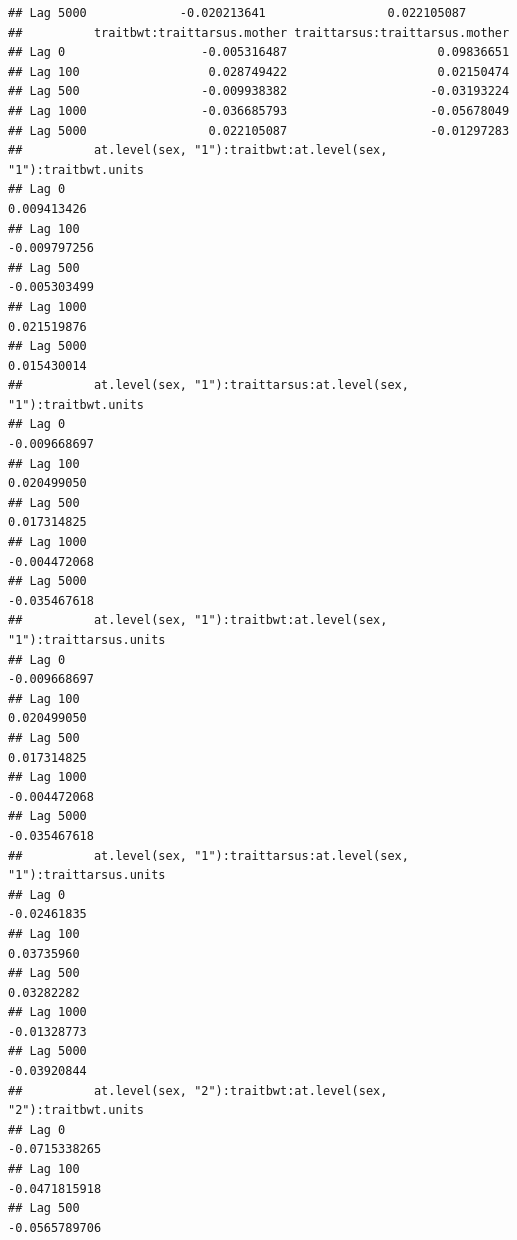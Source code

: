 \documentclass[
  12pt,
]{book}
\begin{document}
\begin{verbatim}
## Lag 5000             -0.020213641                 0.022105087
##          traitbwt:traittarsus.mother traittarsus:traittarsus.mother
## Lag 0                   -0.005316487                     0.09836651
## Lag 100                  0.028749422                     0.02150474
## Lag 500                 -0.009938382                    -0.03193224
## Lag 1000                -0.036685793                    -0.05678049
## Lag 5000                 0.022105087                    -0.01297283
##          at.level(sex, "1"):traitbwt:at.level(sex, "1"):traitbwt.units
## Lag 0                                                      0.009413426
## Lag 100                                                   -0.009797256
## Lag 500                                                   -0.005303499
## Lag 1000                                                   0.021519876
## Lag 5000                                                   0.015430014
##          at.level(sex, "1"):traittarsus:at.level(sex, "1"):traitbwt.units
## Lag 0                                                        -0.009668697
## Lag 100                                                       0.020499050
## Lag 500                                                       0.017314825
## Lag 1000                                                     -0.004472068
## Lag 5000                                                     -0.035467618
##          at.level(sex, "1"):traitbwt:at.level(sex, "1"):traittarsus.units
## Lag 0                                                        -0.009668697
## Lag 100                                                       0.020499050
## Lag 500                                                       0.017314825
## Lag 1000                                                     -0.004472068
## Lag 5000                                                     -0.035467618
##          at.level(sex, "1"):traittarsus:at.level(sex, "1"):traittarsus.units
## Lag 0                                                            -0.02461835
## Lag 100                                                           0.03735960
## Lag 500                                                           0.03282282
## Lag 1000                                                         -0.01328773
## Lag 5000                                                         -0.03920844
##          at.level(sex, "2"):traitbwt:at.level(sex, "2"):traitbwt.units
## Lag 0                                                    -0.0715338265
## Lag 100                                                  -0.0471815918
## Lag 500                                                  -0.0565789706

\end{verbatim}
\end{document}
